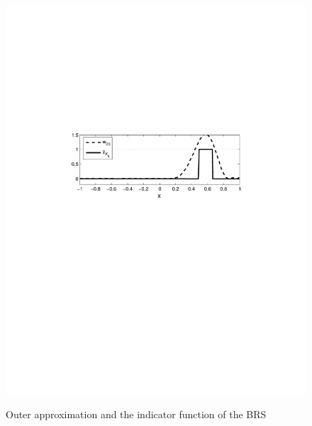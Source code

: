 \begin{figure}[!t]
  {\includegraphics[width=\columnwidth,trim =1.5in 5.55in 1.5in 3.5in, clip=true]{figures/1D_ex_sp}}
  \caption{Outer approximation and the indicator function of the BRS}
    \label{fig:1D:linear}
\end{figure}
